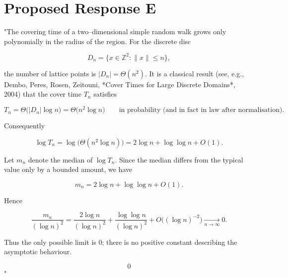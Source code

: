 \documentclass[11pt]{article}
\begin{document}
\section*{Proposed Response E}
"The covering time of a two–dimensional simple random walk grows only polynomially in the radius of the region.  
For the discrete disc  

\[
D_n=\{x\in\mathbb Z^2:\|x\|\le n\},
\]

the number of lattice points is \(\lvert D_n\rvert = \Theta(n^{2})\).  
It is a classical result (see, e.g., Dembo, Peres, Rosen, Zeitouni, *Cover Times for Large Discrete Domains*, 2004) that the cover time \(T_n\) satisfies  

\[
T_n = \Theta\!\bigl(\lvert D_n\rvert\log n\bigr)
     = \Theta\!\bigl(n^{2}\log n\bigr)
\qquad\text{in probability (and in fact in law after normalisation).}
\]

Consequently  

\[
\log T_n = \log\bigl(\Theta(n^{2}\log n)\bigr)
        = 2\log n + \log\log n + O(1).
\]

Let \(m_n\) denote the median of \(\log T_n\).  Since the median differs from the typical value only by a bounded amount, we have  

\[
m_n = 2\log n + \log\log n + O(1).
\]

Hence  

\[
\frac{m_n}{(\log n)^{2}}
   = \frac{2\log n}{(\log n)^{2}}+\frac{\log\log n}{(\log n)^{2}}+O\!\bigl((\log n)^{-2}\bigr)
   \xrightarrow[n\to\infty]{} 0 .
\]

Thus the only possible limit is \(0\); there is no positive constant describing the asymptotic behaviour.

\[
\boxed{0}
\]"
\end{document}
